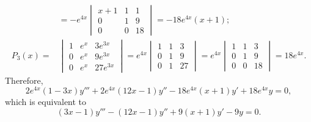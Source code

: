 \documentclass[openany]{book}
\newenvironment{sectionSolutions}{
 \begin{enumerate}[item-label={\thesection.\arabic{enumi}.}]
}{
 \end{enumerate}
}
\begin{document}
\begin{sectionSolutions}
\begin{alist}
\begin{align*}
&=-e^{4x}\begin{vmatrix}
x+1&1&1\\
0&1&9\\
0&0&18
\end{vmatrix}=-18e^{4x}(x+1);\\
P_3(x)=&
\begin{vmatrix}
1&e^x&3e^{3x}\\
0&e^x&9e^{3x}\\
0&e^x&27e^{3x}
\end{vmatrix}=
e^{4x}\begin{vmatrix}
1&1&3\\
0&1&9\\
0&1&27
\end{vmatrix}=
e^{4x}\begin{vmatrix}
1&1&3\\
0&1&9\\
0&0&18
\end{vmatrix}=18e^{4x}.
\end{align*}
Therefore,
\[
2e^{4x}(1-3x)y'''+2e^{4x}(12x-1)y''-18e^{4x}(x+1)y'+18e^{4x}y=0,
\]
which is equivalent to
\[
(3x-1)y'''-(12x-1)y''+9(x+1)y'-9y=0.
\]


\end{alist}
\end{sectionSolutions}
\end{document}
